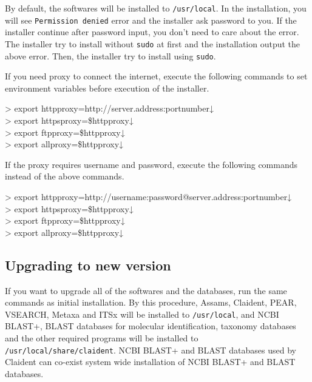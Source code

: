 \documentclass[titlepage,10pt,a4paper,english]{jsbook}
\newenvironment{cmd}{\begin{oframed}\raggedright\ttfamily\footnotesize\setlength{\baselineskip}{1.4em}}{\end{oframed}\vspace{-1em}}
\begin{document}
By default, the softwares will be installed to \texttt{/usr/local}.
In the installation, you will see \texttt{Permission denied} error and the installer ask password to you.
If the installer continue after password input, you don't need to care about the error.
The installer try to install without \texttt{sudo} at first and the installation output the above error.
Then, the installer try to install using \texttt{sudo}.

If you need proxy to connect the internet, execute the following commands to set environment variables before execution of the installer.

\begin{cmd}
{\textgreater} export http{\textunderscore}proxy=http://server.address:portnumber↓\\
{\textgreater} export https{\textunderscore}proxy=\$http{\textunderscore}proxy↓\\
{\textgreater} export ftp{\textunderscore}proxy=\$http{\textunderscore}proxy↓\\
{\textgreater} export all{\textunderscore}proxy=\$http{\textunderscore}proxy↓
\end{cmd}

If the proxy requires username and password, execute the following commands instead of the above commands.

\begin{cmd}
{\textgreater} export http{\textunderscore}proxy=http://username:password@server.address:portnumber↓\\
{\textgreater} export https{\textunderscore}proxy=\$http{\textunderscore}proxy↓\\
{\textgreater} export ftp{\textunderscore}proxy=\$http{\textunderscore}proxy↓\\
{\textgreater} export all{\textunderscore}proxy=\$http{\textunderscore}proxy↓
\end{cmd}

\subsection{Upgrading to new version}

If you want to upgrade all of the softwares and the databases, run the same commands as initial installation.
By this procedure, Assams, Claident, PEAR, VSEARCH, Metaxa and ITSx will be installed to \texttt{/usr/local}, and NCBI BLAST+, BLAST databases for molecular identification, taxonomy databases and the other required programs will be installed to \texttt{/usr/local/share/claident}.
NCBI BLAST+ and BLAST databases used by Claident can co-exist system wide installation of NCBI BLAST+ and BLAST databases.
\end{document}
